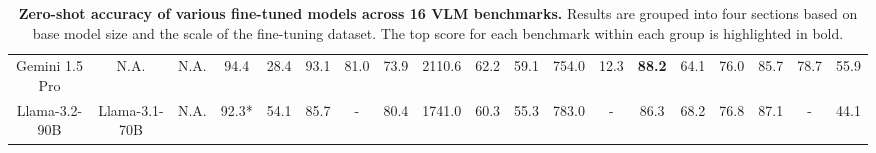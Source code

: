 \begin{table*}[ht]
{\begin{tabular}{ccc|cccccccccccccccc}
        Gemini 1.5 Pro & \hspace{-0.9em}N.A. & \hspace{-0.9em}N.A. & \hspace{-0.5em}94.4 & \hspace{-0.9em}28.4 & \hspace{-0.9em}93.1 & \hspace{-0.9em}81.0 & \hspace{-0.9em}73.9 & \hspace{-0.9em}2110.6 & \hspace{-0.9em}62.2 & \hspace{-0.9em}59.1 & \hspace{-0.9em}754.0 & \hspace{-0.9em}12.3 & \hspace{-0.9em}\textbf{88.2} & \hspace{-0.9em}64.1 & \hspace{-0.9em}76.0 & \hspace{-0.9em}85.7 & \hspace{-0.9em}78.7 & \hspace{-0.9em}55.9 \\ 
        \rowcolor{tablegray}
        Llama-3.2-90B & \hspace{-0.9em}Llama-3.1-70B & \hspace{-0.9em}N.A. & \hspace{-0.5em}92.3* & \hspace{-0.9em}54.1 & \hspace{-0.9em}85.7 & \hspace{-0.9em}- & \hspace{-0.9em}80.4 & \hspace{-0.9em}1741.0 & \hspace{-0.9em}60.3 & \hspace{-0.9em}55.3 & \hspace{-0.9em}783.0 & \hspace{-0.9em}- & \hspace{-0.9em}86.3 & \hspace{-0.9em}68.2 & \hspace{-0.9em}76.8 & \hspace{-0.9em}87.1 & \hspace{-0.9em}- & \hspace{-0.9em}44.1 \\ 
        \bottomrule
        \end{tabular}
        }
    \caption{\textbf{Zero-shot accuracy of various fine-tuned models across 16 VLM benchmarks.} 
    Results are grouped into four sections based on base model size and the scale of the fine-tuning dataset. The top score for each benchmark within each group is highlighted in bold.
}
\end{table*}

